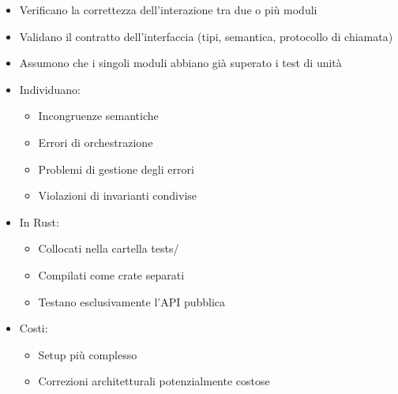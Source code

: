 \begin{itemize}
  \item Verificano la correttezza dell'interazione tra due o più moduli
  \item Validano il contratto dell'interfaccia (tipi, semantica, protocollo di chiamata)
  \item Assumono che i singoli moduli abbiano già superato i test di unità
  \item Individuano:
        \begin{itemize}
          \item Incongruenze semantiche
          \item Errori di orchestrazione
          \item Problemi di gestione degli errori
          \item Violazioni di invarianti condivise
        \end{itemize}
  \item In Rust:
        \begin{itemize}
          \item Collocati nella cartella tests/
          \item Compilati come crate separati
          \item Testano esclusivamente l'API pubblica
        \end{itemize}
  \item Costi:
        \begin{itemize}
          \item Setup più complesso
          \item Correzioni architetturali potenzialmente costose
        \end{itemize}
\end{itemize}












